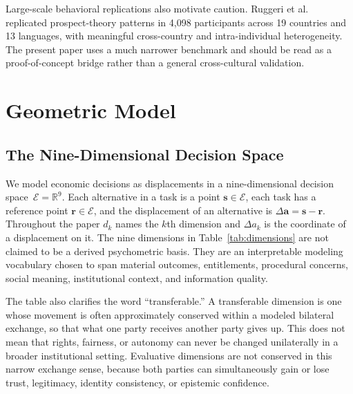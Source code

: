 \documentclass[journal]{IEEEtran}
\newcommand{\E}{\mathcal{E}}               %
\begin{document}
Large-scale behavioral replications also motivate caution.
Ruggeri et al.~\cite{ruggeri2020} replicated prospect-theory patterns in 4,098 participants across 19 countries and 13 languages, with meaningful cross-country and intra-individual heterogeneity.
The present paper uses a much narrower benchmark and should be read as a proof-of-concept bridge rather than a general cross-cultural validation.
\section{Geometric Model}
\label{sec:framework}

\subsection{The Nine-Dimensional Decision Space}

We model economic decisions as displacements in a nine-dimensional decision space~$\E=\mathbb{R}^9$.
Each alternative in a task is a point $\mathbf{s}\in\E$, each task has a reference point $\mathbf{r}\in\E$, and the displacement of an alternative is $\Delta\mathbf{a}=\mathbf{s}-\mathbf{r}$.
Throughout the paper $d_k$ names the $k$th dimension and $\Delta a_k$ is the coordinate of a displacement on it.
The nine dimensions in Table~\ref{tab:dimensions} are not claimed to be a derived psychometric basis.
They are an interpretable modeling vocabulary chosen to span material outcomes, entitlements, procedural concerns, social meaning, institutional context, and information quality.

The table also clarifies the word ``transferable.''
A transferable dimension is one whose movement is often approximately conserved within a modeled bilateral exchange, so that what one party receives another party gives up.
This does not mean that rights, fairness, or autonomy can never be changed unilaterally in a broader institutional setting.
Evaluative dimensions are not conserved in this narrow exchange sense, because both parties can simultaneously gain or lose trust, legitimacy, identity consistency, or epistemic confidence.
\end{document}
